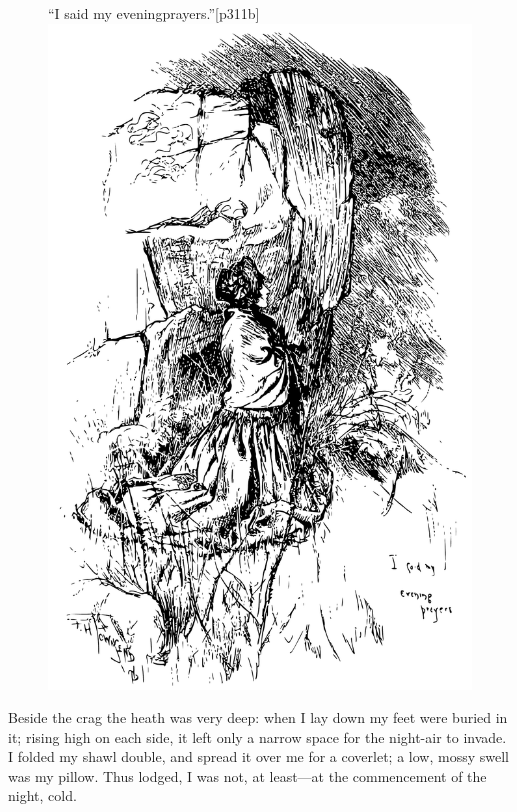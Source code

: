 \begin{figure}
	\begin{sidecaption}{\enquote{I said	my evening\linebreak prayers.}}[p311b]
		\centering
		\includegraphics[width=\linewidth]{images/p311b.pdf}
	\end{sidecaption}
\end{figure}

Beside the crag the heath was very deep: when I lay down my feet were
buried in it; rising high on each side, it left only a narrow space for
the night-air to invade. I folded my shawl double, and spread it over
me for a coverlet; a low, mossy swell was my pillow. Thus lodged, I was
not, at least---at the commencement of the night, cold.


